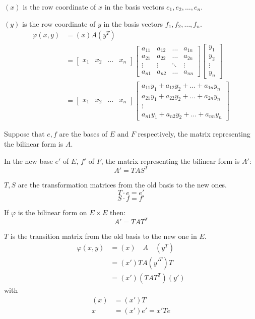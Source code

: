 $(x)$ is the row coordinate of $x$ in the basis vectors $e_1, e_2, \ldots, e_n$.

$(y)$ is the row coordinate of $y$ in the basis vectors $f_1, f_2, \ldots, f_n$.
\begin{align*}
    \varphi(x, y) &= (x) A (y^T)\\
    &= \begin{bmatrix}
        x_1 & x_2 & \ldots & x_n
    \end{bmatrix}
    \begin{bmatrix}
        a_{11} & a_{12} & \ldots & a_{1n}\\
        a_{21} & a_{22} & \ldots & a_{2n}\\
        \vdots & \vdots & \ddots & \vdots\\
        a_{n1} & a_{n2} & \ldots & a_{nn}
    \end{bmatrix}
    \begin{bmatrix}
        y_1\\
        y_2\\
        \vdots\\
        y_n
    \end{bmatrix}\\
    &= \begin{bmatrix}
        x_1 & x_2 & \ldots & x_n
    \end{bmatrix}
    \begin{bmatrix}
        a_{11}y_1 + a_{12}y_2 + \ldots + a_{1n}y_n\\
        a_{21}y_1 + a_{22}y_2 + \ldots + a_{2n}y_n\\
        \vdots \\
        a_{n1}y_1 + a_{n2}y_2 + \ldots + a_{nn}y_n
    \end{bmatrix}
\end{align*}

Suppose that $e, f$ are the bases of $E$ and $F$ respectively, the matrix representing the bilinear form is $A$.

In the new base $e'$ of $E$, $f'$ of $F$, the matrix representing the bilinear form is $A'$:
\begin{equation*}
    A' = T A S^T
\end{equation*}


$T, S$ are the transformation matrices from the old basis to the new ones.
\[
T \cdot e = e'
\]
\[
S \cdot f = f'
\]

If $\varphi$ is the bilinear form on $E \times E$ then:
\[
A' = T A T^T
\]

$T$ is the transition matrix from the old basis to the new one in $E$.
\begin{align*} 
\varphi(x, y) &= (x) \quad A \quad (y^T)\\
&= (x') T A (y'^T) T \\
&= (x') (T A T^T) (y')
\end{align*}
with
\begin{align*}
   (x) &= (x')T\\
   x &= (x')e'=x'Te
\end{align*}


